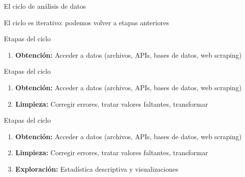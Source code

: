 \documentclass{beamer}
\begin{document}
\begin{frame}{El ciclo de análisis de datos}
\begin{center}
\end{center}

\vspace{0.3cm}

El ciclo es iterativo: podemos volver a etapas anteriores
\end{frame}



\begin{frame}{Etapas del ciclo}
\begin{enumerate}
    \item \textbf{Obtención:} Acceder a datos (archivos, APIs, bases de datos, web scraping)
\end{enumerate}
\end{frame}

\begin{frame}{Etapas del ciclo}
\begin{enumerate}
    \item \textbf{Obtención:} Acceder a datos (archivos, APIs, bases de datos, web scraping)
    \item \textbf{Limpieza:} Corregir errores, tratar valores faltantes, transformar
\end{enumerate}
\end{frame}

\begin{frame}{Etapas del ciclo}
\begin{enumerate}
    \item \textbf{Obtención:} Acceder a datos (archivos, APIs, bases de datos, web scraping)
    \item \textbf{Limpieza:} Corregir errores, tratar valores faltantes, transformar
    \item \textbf{Exploración:} Estadística descriptiva y visualizaciones
\end{enumerate}
\end{frame}
\end{document}
